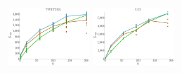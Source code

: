 \documentclass[a4paper]{report}
\newcommand{\wratio}{0.16}
\begin{document}
\vfill
\includegraphics[width=\wratio\textwidth]{maxcut/TWITTER/fs_twitter}\hfill
\includegraphics[width=\wratio\textwidth]{maxcut/UCI/fs_uci}\hfill
\clearpage
\end{document}
